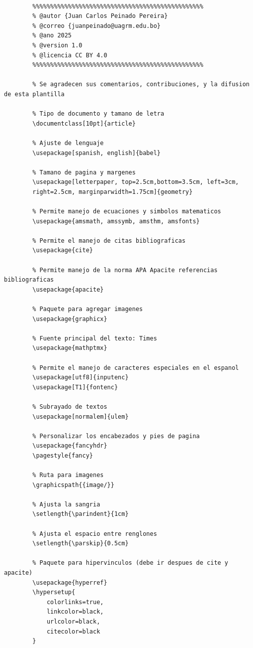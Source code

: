 \documentclass[10pt]{article}
\begin{document}
    \begin{lstlisting}[style=mystyle]
      
        %%%%%%%%%%%%%%%%%%%%%%%%%%%%%%%%%%%%%%%%%%%%%%%%
        % @autor {Juan Carlos Peinado Pereira}
        % @correo {juanpeinado@uagrm.edu.bo}
        % @ano 2025
        % @version 1.0
        % @licencia CC BY 4.0
        %%%%%%%%%%%%%%%%%%%%%%%%%%%%%%%%%%%%%%%%%%%%%%%%
    
        % Se agradecen sus comentarios, contribuciones, y la difusion de esta plantilla
        
        % Tipo de documento y tamano de letra
        \documentclass[10pt]{article}
        
        % Ajuste de lenguaje
        \usepackage[spanish, english]{babel}
        
        % Tamano de pagina y margenes
        \usepackage[letterpaper, top=2.5cm,bottom=3.5cm, left=3cm, 
        right=2.5cm, marginparwidth=1.75cm]{geometry}
        
        % Permite manejo de ecuaciones y simbolos matematicos
        \usepackage{amsmath, amssymb, amsthm, amsfonts}
        
        % Permite el manejo de citas bibliograficas
        \usepackage{cite}
        
        % Permite manejo de la norma APA Apacite referencias bibliograficas
        \usepackage{apacite}
        
        % Paquete para agregar imagenes
        \usepackage{graphicx}
        
        % Fuente principal del texto: Times
        \usepackage{mathptmx}
        
        % Permite el manejo de caracteres especiales en el espanol
        \usepackage[utf8]{inputenc} 
        \usepackage[T1]{fontenc}
        
        % Subrayado de textos
        \usepackage[normalem]{ulem}
        
        % Personalizar los encabezados y pies de pagina
        \usepackage{fancyhdr}
        \pagestyle{fancy}
        
        % Ruta para imagenes
        \graphicspath{{image/}}
        
        % Ajusta la sangria
        \setlength{\parindent}{1cm}
        
        % Ajusta el espacio entre renglones
        \setlength{\parskip}{0.5cm}
        
        % Paquete para hipervinculos (debe ir despues de cite y apacite)
        \usepackage{hyperref}
        \hypersetup{
            colorlinks=true,
            linkcolor=black,
            urlcolor=black,
            citecolor=black
        }
        

\end{lstlisting}
\end{document}
